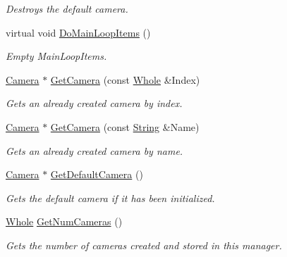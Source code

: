 \begin{DoxyCompactItemize}
\begin{DoxyCompactList}\small\item\em Destroys the default camera. \item\end{DoxyCompactList}\item 
virtual void \hyperlink{classMezzanine_1_1CameraManager_a91db1fdfe96f32d06f689d37b91140cb}{DoMainLoopItems} ()
\begin{DoxyCompactList}\small\item\em Empty MainLoopItems. \item\end{DoxyCompactList}\item 
\hyperlink{classMezzanine_1_1Camera}{Camera} $\ast$ \hyperlink{classMezzanine_1_1CameraManager_a1cb3d08933481db98015384a0a80601b}{GetCamera} (const \hyperlink{namespaceMezzanine_adcbb6ce6d1eb4379d109e51171e2e493}{Whole} \&Index)
\begin{DoxyCompactList}\small\item\em Gets an already created camera by index. \item\end{DoxyCompactList}\item 
\hyperlink{classMezzanine_1_1Camera}{Camera} $\ast$ \hyperlink{classMezzanine_1_1CameraManager_a825b175730d6782071289f6df45bb79f}{GetCamera} (const \hyperlink{namespaceMezzanine_acf9fcc130e6ebf08e3d8491aebcf1c86}{String} \&Name)
\begin{DoxyCompactList}\small\item\em Gets an already created camera by name. \item\end{DoxyCompactList}\item 
\hyperlink{classMezzanine_1_1Camera}{Camera} $\ast$ \hyperlink{classMezzanine_1_1CameraManager_a09c085281b2084711af3de4d46c9a104}{GetDefaultCamera} ()
\begin{DoxyCompactList}\small\item\em Gets the default camera if it has been initialized. \item\end{DoxyCompactList}\item 
\hyperlink{namespaceMezzanine_adcbb6ce6d1eb4379d109e51171e2e493}{Whole} \hyperlink{classMezzanine_1_1CameraManager_aff1a5c332872cfd7db6c8f6bb75e1274}{GetNumCameras} ()
\begin{DoxyCompactList}\small\item\em Gets the number of cameras created and stored in this manager. \item\end{DoxyCompactList}\item 

\end{DoxyCompactItemize}
